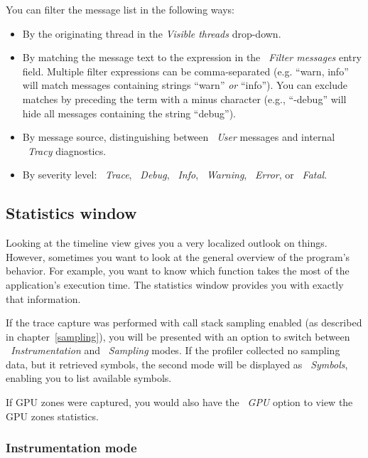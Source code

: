 \documentclass[hidelinks,titlepage,a4paper,twoside]{article}
\begin{document}
You can filter the message list in the following ways:

\begin{itemize}
\item By the originating thread in the \emph{\faShuffle{} Visible threads} drop-down.
\item By matching the message text to the expression in the \emph{\faFilter{}~Filter messages} entry field. Multiple filter expressions can be comma-separated (e.g. \enquote{warn, info} will match messages containing strings \enquote{warn} \emph{or} \enquote{info}). You can exclude matches by preceding the term with a minus character (e.g., \enquote{-debug} will hide all messages containing the string \enquote{debug}).
\item By message source, distinguishing between \emph{\faUser{}~User} messages and internal \emph{\faMicroscope{}~Tracy} diagnostics.
\item By severity level: \emph{\faShoePrints{}~Trace}, \emph{\faBug{}~Debug}, \emph{\faInfo{}~Info}, \emph{\faTriangleExclamation{}~Warning}, \emph{\faCircleXmark{}~Error}, or \emph{\faSkullCrossbones{}~Fatal}.
\end{itemize}

\subsection{Statistics window}
\label{statistics}

Looking at the timeline view gives you a very localized outlook on things. However, sometimes you want to look at the general overview of the program's behavior. For example, you want to know which function takes the most of the application's execution time. The statistics window provides you with exactly that information.

If the trace capture was performed with call stack sampling enabled (as described in chapter~\ref{sampling}), you will be presented with an option to switch between \emph{\faSyringe{}~Instrumentation} and \emph{\faEyeDropper{}~Sampling} modes. If the profiler collected no sampling data, but it retrieved symbols, the second mode will be displayed as \emph{\faPuzzlePiece{}~Symbols}, enabling you to list available symbols.

If GPU zones were captured, you would also have the \emph{\faEye{}~GPU} option to view the GPU zones statistics.

\subsubsection{Instrumentation mode}
\end{document}
